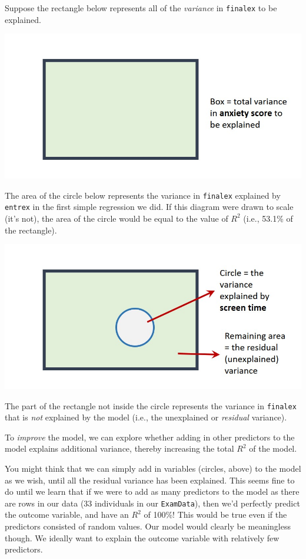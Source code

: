 \documentclass[
]{book}
\theoremstyle{definition}
\theoremstyle{definition}
\theoremstyle{definition}
\theoremstyle{definition}
\theoremstyle{remark}
\begin{document}
Suppose the rectangle below represents all of the \emph{variance} in \texttt{finalex} to be explained.

\includegraphics{images/Venn1.jpg}

The area of the circle below represents the variance in \texttt{finalex} explained by \texttt{entrex} in the first simple regression we did. If this diagram were drawn to scale (it's not), the area of the circle would be equal to the value of \(R^2\) (i.e., 53.1\% of the rectangle).

\includegraphics{images/Venn2.jpg}

The part of the rectangle not inside the circle represents the variance in \texttt{finalex} that is \emph{not} explained by the model (i.e., the unexplained or \emph{residual} variance).

To \emph{improve} the model, we can explore whether adding in other predictors to the model explains additional variance, thereby increasing the total \(R^2\) of the model.

You might think that we can simply add in variables (circles, above) to the model as we wish, until all the residual variance has been explained. This seems fine to do until we learn that if we were to add as many predictors to the model as there are rows in our data (33 individuals in our \texttt{ExamData}), then we'd perfectly predict the outcome variable, and have an \(R^2\) of 100\%! This would be true even if the predictors consisted of random values. Our model would clearly be meaningless though. We ideally want to explain the outcome variable with relatively few predictors.
\end{document}
